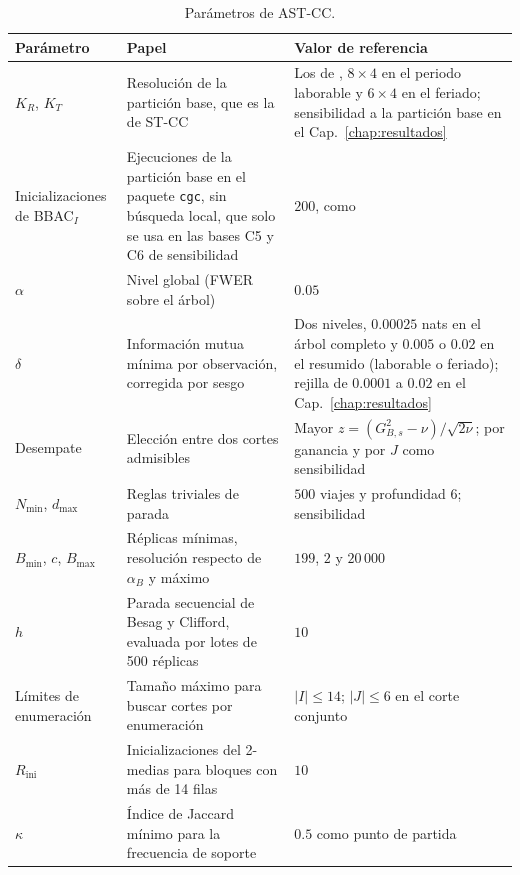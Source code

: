 \begin{table}[t]
\centering
\small
\begin{tabular}{>{\raggedright\arraybackslash}p{}>{\raggedright\arraybackslash}p{}>{\raggedright\arraybackslash}p{}}
\toprule
Parámetro & Papel & Valor de referencia \\
\midrule
$K_R$, $K_T$ & Resolución de la partición base, que es la de ST-CC & Los de \citet{Liu2021}, $8\times4$ en el periodo laborable y $6\times4$ en el feriado; sensibilidad a la partición base en el Cap.~\ref{chap:resultados} \\
Inicializaciones de BBAC$_I$ & Ejecuciones de la partición base en el paquete \texttt{cgc}, sin búsqueda local, que solo se usa en las bases C5 y C6 de sensibilidad & $200$, como \citet{Liu2021} \\
$\alpha$ & Nivel global (\ac{FWER} sobre el árbol) & $0.05$ \\
$\delta$ & Información mutua mínima por observación, corregida por sesgo & Dos niveles, $0.00025$ nats en el árbol completo y $0.005$ o $0.02$ en el resumido (laborable o feriado); rejilla de $0.0001$ a $0.02$ en el Cap.~\ref{chap:resultados} \\
Desempate & Elección entre dos cortes admisibles & Mayor $z=(G^2_{B,s}-\nu)/\sqrt{2\nu}$; por ganancia y por $J$ como sensibilidad \\
$N_{\min}$, $d_{\max}$ & Reglas triviales de parada & $500$ viajes y profundidad $6$; sensibilidad \\
$B_{\min}$, $c$, $B_{\max}$ & Réplicas mínimas, resolución respecto de $\alpha_B$ y máximo & $199$, $2$ y $20\,000$ \\
$h$ & Parada secuencial de Besag y Clifford, evaluada por lotes de 500 réplicas & $10$ \\
Límites de enumeración & Tamaño máximo para buscar cortes por enumeración & $|I|\le14$; $|J|\le6$ en el corte conjunto \\
$R_{\mathrm{ini}}$ & Inicializaciones del 2-medias para bloques con más de 14 filas & $10$ \\
$\kappa$ & Índice de Jaccard mínimo para la frecuencia de soporte & $0.5$ como punto de partida \\
\bottomrule
\end{tabular}
\caption{Parámetros de AST-CC.}
\label{tab:prop-parametros}
\end{table}


